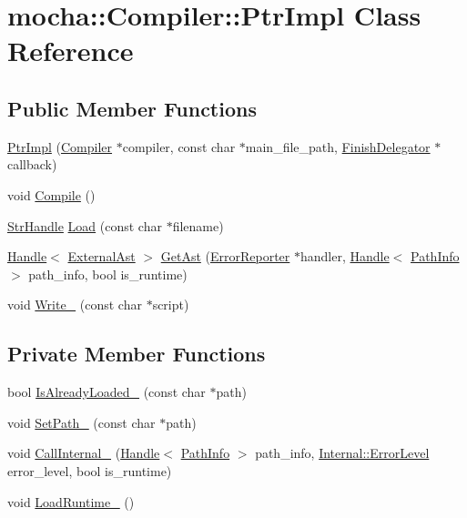 \hypertarget{classmocha_1_1_compiler_1_1_ptr_impl}{
\section{mocha::Compiler::PtrImpl Class Reference}
\label{classmocha_1_1_compiler_1_1_ptr_impl}
}
\subsection*{Public Member Functions}
\begin{DoxyCompactItemize}
\item 
\hyperlink{classmocha_1_1_compiler_1_1_ptr_impl_a0b0440bc8c8f21e0f3eee01de18dc6c7}{PtrImpl} (\hyperlink{classmocha_1_1_compiler}{Compiler} $\ast$compiler, const char $\ast$main\_\-file\_\-path, \hyperlink{classmocha_1_1_finish_delegator}{FinishDelegator} $\ast$callback)
\item 
void \hyperlink{classmocha_1_1_compiler_1_1_ptr_impl_a28a6366b54b59dd3b7a4aa8306afb891}{Compile} ()
\item 
\hyperlink{classmocha_1_1_array_handle}{StrHandle} \hyperlink{classmocha_1_1_compiler_1_1_ptr_impl_ada9e981ec968bd5495291c35dd778b15}{Load} (const char $\ast$filename)
\item 
\hyperlink{classmocha_1_1_handle}{Handle}$<$ \hyperlink{classmocha_1_1_external_ast}{ExternalAst} $>$ \hyperlink{classmocha_1_1_compiler_1_1_ptr_impl_a4c9befe0bc862dcdaa28721ceca57683}{GetAst} (\hyperlink{classmocha_1_1_error_reporter}{ErrorReporter} $\ast$handler, \hyperlink{classmocha_1_1_handle}{Handle}$<$ \hyperlink{classmocha_1_1_path_info}{PathInfo} $>$ path\_\-info, bool is\_\-runtime)
\item 
void \hyperlink{classmocha_1_1_compiler_1_1_ptr_impl_a22f46815f61d3c61b11637e5cb60639b}{Write\_\-} (const char $\ast$script)
\end{DoxyCompactItemize}
\subsection*{Private Member Functions}
\begin{DoxyCompactItemize}
\item 
bool \hyperlink{classmocha_1_1_compiler_1_1_ptr_impl_aa03e0480cce139654c0f4289a16e9910}{IsAlreadyLoaded\_\-} (const char $\ast$path)
\item 
void \hyperlink{classmocha_1_1_compiler_1_1_ptr_impl_a21a7ebdfdbb5ecefd19d3bc98de024c4}{SetPath\_\-} (const char $\ast$path)
\item 
void \hyperlink{classmocha_1_1_compiler_1_1_ptr_impl_a9ecdb1e639f070bf02b95d0c027093d7}{CallInternal\_\-} (\hyperlink{classmocha_1_1_handle}{Handle}$<$ \hyperlink{classmocha_1_1_path_info}{PathInfo} $>$ path\_\-info, \hyperlink{classmocha_1_1_internal_afbba1f8f92938ca06cc3411b328995e9}{Internal::ErrorLevel} error\_\-level, bool is\_\-runtime)
\item 
void \hyperlink{classmocha_1_1_compiler_1_1_ptr_impl_a631e65ace69a90e9154389943949c408}{LoadRuntime\_\-} ()
\end{DoxyCompactItemize}
